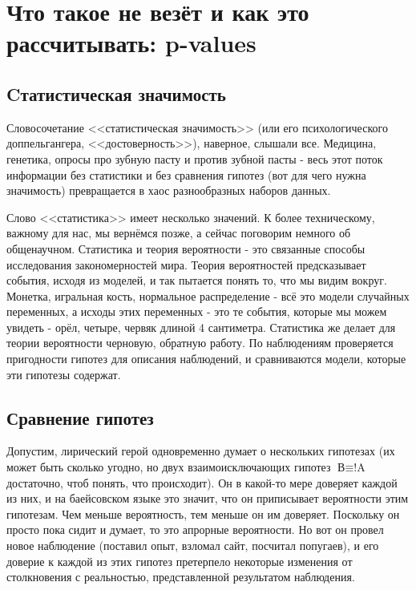 \documentclass{book}
\begin{document}

\chapter[Что такое не везёт: p-values]{Что такое не везёт и как это рассчитывать: p-values}

\section*{Cтатистическая значимость}

Словосочетание <<статистическая значимость>> (или его психологического доппельгангера, <<достоверность>>), наверное, слышали все. Медицина, генетика, опросы про зубную пасту и против зубной пасты - весь этот поток информации без статистики и без сравнения гипотез (вот для чего нужна значимость) превращается в хаос разнообразных наборов данных.

Слово <<статистика>> имеет несколько значений. К более техническому, важному для нас, мы вернёмся позже, а сейчас поговорим немного об общенаучном. Статистика и теория вероятности - это связанные способы исследования закономерностей мира. Теория вероятностей предсказывает события, исходя из моделей, и так пытается понять то, что мы видим вокруг. Монетка, игральная кость, нормальное распределение - всё это модели случайных переменных, а исходы этих переменных - это те события, которые мы можем увидеть - орёл, четыре, червяк длиной 4 сантиметра. Статистика же делает для теории вероятности черновую, обратную работу. По наблюдениям проверяется пригодности гипотез для описания наблюдений, и сравниваются модели, которые эти гипотезы содержат. 

\section*{Сравнение гипотез}

 Допустим, лирический герой одновременно думает о нескольких гипотезах (их может быть сколько угодно, но двух взаимоисключающих гипотез $\text{В} \equiv \text{!A}$ достаточно, чтоб понять, что происходит). Он в какой-то мере доверяет каждой из них, и на баейсовском языке это значит, что он приписывает вероятности этим гипотезам. Чем меньше вероятность, тем меньше он им доверяет. Поскольку он просто пока сидит и думает, то это апрорные вероятности. Но вот он провел новое наблюдение  (поставил опыт, взломал сайт, посчитал попугаев), и его доверие к каждой из этих гипотез претерпело некоторые изменения от столкновения с реальностью, представленной результатом наблюдения.
\end{document}
